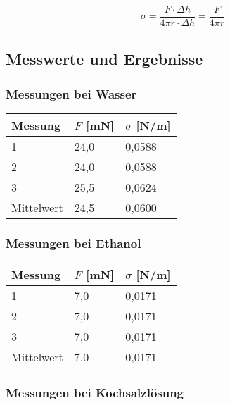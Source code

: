 \documentclass{scrartcl}
\begin{document}
\begin{align}
\sigma = \dfrac{F \cdot \Delta h}{4 \pi r \cdot \Delta h} = \dfrac{F}{4 \pi r} \label{eq:sigma}
\end{align}
\subsection{Messwerte und Ergebnisse}
\subsubsection{Messungen bei Wasser}

\begin{table}[H]
\begin{center}
\begin{tabular}{l|l|l}
Messung    & $F$ {[}mN{]} & $\sigma$ {[}N/m{]} \\
\hline
1          & 24,0       & 0,0588    \\
2          & 24,0       & 0,0588    \\
3          & 25,5       & 0,0624    \\
Mittelwert & 24,5       & 0,0600                    
\end{tabular}
\end{center}
\label{tab:Wasser}
\end{table}
\subsubsection{Messungen bei Ethanol}

\begin{table}[H]
\begin{center}
\begin{tabular}{l|l|l}
Messung    & $F$ {[}mN{]} & $\sigma$ {[}N/m{]} \\
\hline
1          & 7,0       & 0,0171    \\
2          & 7,0       & 0,0171    \\
3          & 7,0       & 0,0171    \\
Mittelwert & 7,0       & 0,0171                    
\end{tabular}
\end{center}
\label{tab:Ethanol}
\end{table}
\subsubsection{Messungen bei Kochsalzlösung}
\end{document}

